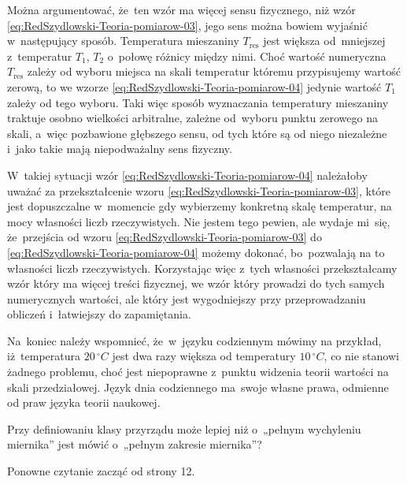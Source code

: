 \documentclass[a4paper,11pt]{article}
\numberwithin{equation}{section}
\begin{document}
Można argumentować, że~ten wzór ma więcej sensu fizycznego, niż wzór
\eqref{eq:RedSzydlowski-Teoria-pomiarow-03}, jego sens można bowiem wyjaśnić
w~następujący sposób. Temperatura mieszaniny $T_{ \textrm{res} }$ jest większa
od~mniejszej z~temperatur $T_{ 1 }$, $T_{ 2 }$ o~połowę różnicy między nimi.
Choć wartość numeryczna $T_{ \textrm{res} }$ zależy od wyboru miejsca na skali
temperatur któremu przypisujemy wartość zerową, to we wzorze
\eqref{eq:RedSzydlowski-Teoria-pomiarow-04} jedynie wartość $T_{ 1 }$ zależy
od tego wyboru. Taki więc sposób wyznaczania temperatury mieszaniny traktuje
osobno wielkości arbitralne, zależne od~wyboru punktu zerowego na skali,
a~więc pozbawione głębszego sensu, od tych które są od niego
niezależne i~jako takie mają niepodważalny sens fizyczny.

W~takiej sytuacji wzór \eqref{eq:RedSzydlowski-Teoria-pomiarow-04}
należałoby uważać za przekształcenie wzoru
\eqref{eq:RedSzydlowski-Teoria-pomiarow-03}, które jest dopuszczalne
w~momencie gdy wybierzemy konkretną skalę temperatur, na mocy własności
liczb rzeczywistych. Nie jestem tego pewien, ale wydaje mi~się, że~przejścia
od wzoru \eqref{eq:RedSzydlowski-Teoria-pomiarow-03} do
\eqref{eq:RedSzydlowski-Teoria-pomiarow-04} możemy dokonać, bo~pozwalają na
to własności liczb rzeczywistych. Korzystając więc z~tych własności
przekształcamy wzór który ma więcej treści fizycznej, we wzór który prowadzi
do tych samych numerycznych wartości, ale który jest wygodniejszy przy
przeprowadzaniu obliczeń i~łatwiejszy do zapamiętania.

Na~koniec należy wspomnieć, że~w~języku codziennym mówimy na przykład,
iż~temperatura $20 \, {}^{ \circ }\si{C}$ jest dwa razy większa od temperatury
$10 \, {}^{ \circ }\si{C}$, co nie stanowi żadnego problemu, choć jest
niepoprawne z~punktu widzenia teorii wartości na skali przedziałowej. Język
dnia codziennego ma~swoje własne prawa, odmienne od praw języka teorii
naukowej.

\VerSpaceFour





\noindent
{} Przy definiowaniu klasy przyrządu może lepiej niż o~„pełnym
wychyleniu miernika” jest mówić o~„pełnym zakresie miernika”?

\VerSpaceFour





{\Large Ponowne czytanie zacząć od strony 12.}
\end{document}
